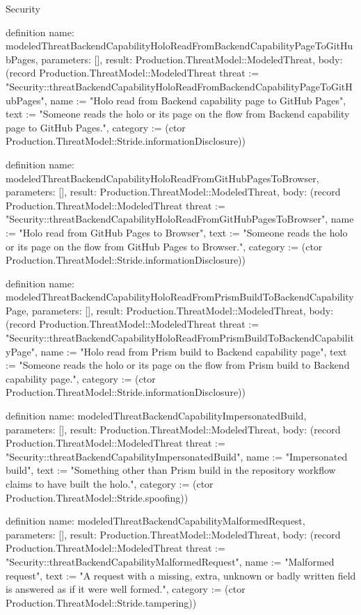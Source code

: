 \begin{lexlean}{Security}
\begin{semanticmodule}
definition{
  name: modeledThreatBackendCapabilityHoloReadFromBackendCapabilityPageToGitHubPages,
  parameters: [],
  result: Production.ThreatModel::ModeledThreat,
  body: (record Production.ThreatModel::ModeledThreat {threat := "Security::threatBackendCapabilityHoloReadFromBackendCapabilityPageToGitHubPages", name := "Holo read from Backend capability page to GitHub Pages", text := "Someone reads the holo or its page on the flow from Backend capability page to GitHub Pages.", category := (ctor Production.ThreatModel::Stride.informationDisclosure)})
}

definition{
  name: modeledThreatBackendCapabilityHoloReadFromGitHubPagesToBrowser,
  parameters: [],
  result: Production.ThreatModel::ModeledThreat,
  body: (record Production.ThreatModel::ModeledThreat {threat := "Security::threatBackendCapabilityHoloReadFromGitHubPagesToBrowser", name := "Holo read from GitHub Pages to Browser", text := "Someone reads the holo or its page on the flow from GitHub Pages to Browser.", category := (ctor Production.ThreatModel::Stride.informationDisclosure)})
}

definition{
  name: modeledThreatBackendCapabilityHoloReadFromPrismBuildToBackendCapabilityPage,
  parameters: [],
  result: Production.ThreatModel::ModeledThreat,
  body: (record Production.ThreatModel::ModeledThreat {threat := "Security::threatBackendCapabilityHoloReadFromPrismBuildToBackendCapabilityPage", name := "Holo read from Prism build to Backend capability page", text := "Someone reads the holo or its page on the flow from Prism build to Backend capability page.", category := (ctor Production.ThreatModel::Stride.informationDisclosure)})
}

definition{
  name: modeledThreatBackendCapabilityImpersonatedBuild,
  parameters: [],
  result: Production.ThreatModel::ModeledThreat,
  body: (record Production.ThreatModel::ModeledThreat {threat := "Security::threatBackendCapabilityImpersonatedBuild", name := "Impersonated build", text := "Something other than Prism build in the repository workflow claims to have built the holo.", category := (ctor Production.ThreatModel::Stride.spoofing)})
}

definition{
  name: modeledThreatBackendCapabilityMalformedRequest,
  parameters: [],
  result: Production.ThreatModel::ModeledThreat,
  body: (record Production.ThreatModel::ModeledThreat {threat := "Security::threatBackendCapabilityMalformedRequest", name := "Malformed request", text := "A request with a missing, extra, unknown or badly written field is answered as if it were well formed.", category := (ctor Production.ThreatModel::Stride.tampering)})
}


\end{semanticmodule}
\end{lexlean}
